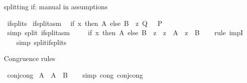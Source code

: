 \begin{isabellebody}
\begin{isamarkuptext}
splitting if: manual in assumptions%
\end{isamarkuptext}\isamarkuptrue%
\isamarkupfalse%
\ if{\isacharunderscore}{\kern0pt}splits\isanewline
{}\isamarkupfalse%
\ if{\isacharunderscore}{\kern0pt}split{\isacharunderscore}{\kern0pt}asm\isanewline
\isanewline
{}\isamarkupfalse%
\ {\isachardoublequoteopen}{\isasymlbrakk}\ {\isacharparenleft}{\kern0pt}if\ x\ then\ A\ else\ B{\isacharparenright}{\kern0pt}\ {\isacharequal}{\kern0pt}\ z{\isacharsemicolon}{\kern0pt}\ Q\ {\isasymrbrakk}\ {\isasymLongrightarrow}\ P{\isachardoublequoteclose}\isanewline
\ \ \ \ \isanewline
%
\isadelimproof
\ \ \ %
\endisadelimproof
%
\isatagproof
{}\isamarkupfalse%
\ {\isacharparenleft}{\kern0pt}simp\ split{\isacharcolon}{\kern0pt}\ if{\isacharunderscore}{\kern0pt}split{\isacharunderscore}{\kern0pt}asm{\isacharparenright}{\kern0pt}\isanewline
\ \ \isamarkupfalse%
%
\endisatagproof
{\isafoldproof}%
%
\isadelimproof
\isanewline
%
\endisadelimproof
\isanewline
{}\isamarkupfalse%
\ {\isachardoublequoteopen}\ {\isacharparenleft}{\kern0pt}{\isacharparenleft}{\kern0pt}if\ x\ then\ A\ else\ B{\isacharparenright}{\kern0pt}\ {\isacharequal}{\kern0pt}\ z{\isacharparenright}{\kern0pt}\ {\isasymlongrightarrow}\ {\isacharparenleft}{\kern0pt}z\ {\isacharequal}{\kern0pt}\ A\ {\isasymor}\ z\ {\isacharequal}{\kern0pt}\ B{\isacharparenright}{\kern0pt}{\isachardoublequoteclose}\isanewline
%
\isadelimproof
\ \ %
\endisadelimproof
%
\isatagproof
{}\isamarkupfalse%
\ {\isacharparenleft}{\kern0pt}rule\ impI{\isacharparenright}{\kern0pt}\isanewline
\ \ \isamarkupfalse%
\ {\isacharparenleft}{\kern0pt}simp\ split{\isacharcolon}{\kern0pt}if{\isacharunderscore}{\kern0pt}splits{\isacharparenright}{\kern0pt}\isanewline
{}\isamarkupfalse%
%
\endisatagproof
{\isafoldproof}%
%
\isadelimproof
%
\endisadelimproof
%
\begin{isamarkuptext}%
Congruence rules%
\end{isamarkuptext}\isamarkuptrue%
\isamarkupfalse%
\ conj{\isacharunderscore}{\kern0pt}cong\isanewline
\isanewline
{}\isamarkupfalse%
\ {\isachardoublequoteopen}A\ {\isasymand}\ {\isacharparenleft}{\kern0pt}A\ {\isasymlongrightarrow}\ B{\isacharparenright}{\kern0pt}{\isachardoublequoteclose}\isanewline
%
\isadelimproof
\ \ %
\endisadelimproof
%
\isatagproof
{}\isamarkupfalse%
\ {\isacharparenleft}{\kern0pt}simp\ cong{\isacharcolon}{\kern0pt}\ conj{\isacharunderscore}{\kern0pt}cong{\isacharparenright}{\kern0pt}\isanewline

\end{isabellebody}
